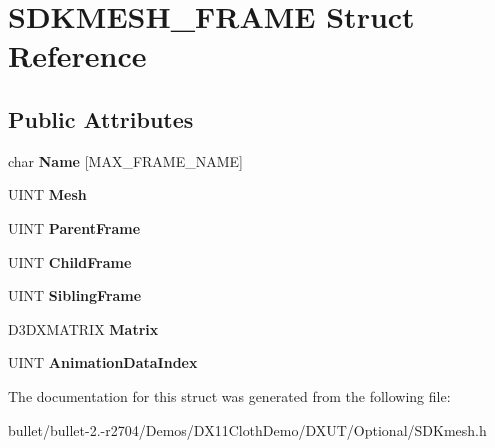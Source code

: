 \hypertarget{struct_s_d_k_m_e_s_h___f_r_a_m_e}{\section{S\+D\+K\+M\+E\+S\+H\+\_\+\+F\+R\+A\+M\+E Struct Reference}
\label{struct_s_d_k_m_e_s_h___f_r_a_m_e}
}
\subsection*{Public Attributes}
\begin{DoxyCompactItemize}
\item 
\hypertarget{struct_s_d_k_m_e_s_h___f_r_a_m_e_a1008074195b1b3af5d6b8d3120f002b8}{char {\bfseries Name} \mbox{[}M\+A\+X\+\_\+\+F\+R\+A\+M\+E\+\_\+\+N\+A\+M\+E\mbox{]}}\label{struct_s_d_k_m_e_s_h___f_r_a_m_e_a1008074195b1b3af5d6b8d3120f002b8}

\item 
\hypertarget{struct_s_d_k_m_e_s_h___f_r_a_m_e_a50666f895e35950e2613ee80efda6f98}{U\+I\+N\+T {\bfseries Mesh}}\label{struct_s_d_k_m_e_s_h___f_r_a_m_e_a50666f895e35950e2613ee80efda6f98}

\item 
\hypertarget{struct_s_d_k_m_e_s_h___f_r_a_m_e_ad4e6603a5ebc0df131722ad2703d5314}{U\+I\+N\+T {\bfseries Parent\+Frame}}\label{struct_s_d_k_m_e_s_h___f_r_a_m_e_ad4e6603a5ebc0df131722ad2703d5314}

\item 
\hypertarget{struct_s_d_k_m_e_s_h___f_r_a_m_e_a177bf28f4a1e981b068b190880473281}{U\+I\+N\+T {\bfseries Child\+Frame}}\label{struct_s_d_k_m_e_s_h___f_r_a_m_e_a177bf28f4a1e981b068b190880473281}

\item 
\hypertarget{struct_s_d_k_m_e_s_h___f_r_a_m_e_ab7f19cc4682522ace123f543c65dfc04}{U\+I\+N\+T {\bfseries Sibling\+Frame}}\label{struct_s_d_k_m_e_s_h___f_r_a_m_e_ab7f19cc4682522ace123f543c65dfc04}

\item 
\hypertarget{struct_s_d_k_m_e_s_h___f_r_a_m_e_a7cd5a19069a49de0cbed4be9ef85dda1}{D3\+D\+X\+M\+A\+T\+R\+I\+X {\bfseries Matrix}}\label{struct_s_d_k_m_e_s_h___f_r_a_m_e_a7cd5a19069a49de0cbed4be9ef85dda1}

\item 
\hypertarget{struct_s_d_k_m_e_s_h___f_r_a_m_e_ab4dfaca1b475d54e5e06d6474fdb4e70}{U\+I\+N\+T {\bfseries Animation\+Data\+Index}}\label{struct_s_d_k_m_e_s_h___f_r_a_m_e_ab4dfaca1b475d54e5e06d6474fdb4e70}

\end{DoxyCompactItemize}


The documentation for this struct was generated from the following file\+:\begin{DoxyCompactItemize}
\item 
bullet/bullet-\/2.-\/r2704/\+Demos/\+D\+X11\+Cloth\+Demo/\+D\+X\+U\+T/\+Optional/S\+D\+Kmesh.\+h\end{DoxyCompactItemize}
